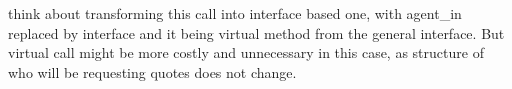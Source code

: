 \begin{DoxyRefList}
\item[\label{_dev_stage2__DevStage2000008}%
\hypertarget{_dev_stage2__DevStage2000008}{}%
Member \hyperlink{classsolar__core_1_1_s_e_i_aa4cf0e7d6539c591a9762941b1a19bfa}{solar\+\_\+core\+:\+:S\+E\+I\+:\+:form\+\_\+online\+\_\+quote} (\hyperlink{classsolar__core_1_1_household}{Household} $\ast$agent\+\_\+in)]think about transforming this call into interface based one, with agent\+\_\+in replaced by interface and it being virtual method from the general interface. But virtual call might be more costly and unnecessary in this case, as structure of who will be requesting quotes does not change. 
\end{DoxyRefList}